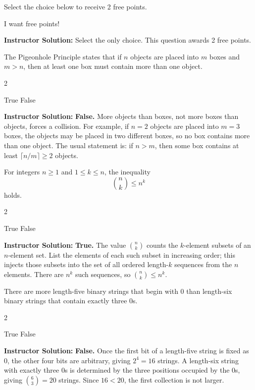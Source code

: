 \documentclass[11pt,addpoints]{exam}
\renewenvironment{solution}
{\par\medskip\noindent\hrulefill\par\smallskip\noindent\textbf{Instructor Solution:}\enspace\ignorespaces}
{\par\smallskip\noindent\hrulefill\par\medskip}
\begin{document}
\begin{questions}

\question[2] Select the choice below to receive 2 free points.
\begin{choices}
    \CorrectChoice I want free points!
\end{choices}
\begin{solution}
Select the only choice. This question awards 2 free points.
\end{solution}

\question[3] The Pigeonhole Principle states that if $n$ objects are placed into $m$ boxes and $m>n$, then at least one box must contain more than one object.
\begin{multicols}{2}
\begin{choices}
    \choice True
    \CorrectChoice False
\end{choices}
\end{multicols}
\begin{solution}
\textbf{False.} More objects than boxes, not more boxes than objects, forces a collision. For example, if $n=2$ objects are placed into $m=3$ boxes, the objects may be placed in two different boxes, so no box contains more than one object. The usual statement is: if $n>m$, then some box contains at least $\lceil n/m\rceil\ge 2$ objects.
\end{solution}

\question[3] For integers $n\ge 1$ and $1\le k\le n$, the inequality
\[
\binom{n}{k}\le n^k
\]
holds.
\begin{multicols}{2}
\begin{choices}
    \CorrectChoice True
    \choice False
\end{choices}
\end{multicols}
\begin{solution}
\textbf{True.} The value $\binom{n}{k}$ counts the $k$-element subsets of an $n$-element set. List the elements of each such subset in increasing order; this injects those subsets into the set of all ordered length-$k$ sequences from the $n$ elements. There are $n^k$ such sequences, so $\binom{n}{k}\le n^k$.
\end{solution}

\question[3] There are more length-five binary strings that begin with $0$ than length-six binary strings that contain exactly three $0$s.
\begin{multicols}{2}
\begin{choices}
    \choice True
    \CorrectChoice False
\end{choices}
\end{multicols}
\begin{solution}
\textbf{False.} Once the first bit of a length-five string is fixed as $0$, the other four bits are arbitrary, giving $2^4=16$ strings. A length-six string with exactly three $0$s is determined by the three positions occupied by the $0$s, giving $\binom{6}{3}=20$ strings. Since $16<20$, the first collection is not larger.
\end{solution}


\end{questions}
\end{document}
